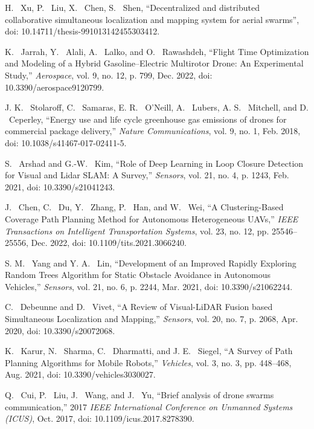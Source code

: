 \documentclass[conference]{IEEEtran}
\begin{document}
\begin{thebibliography}{1}
H. ~Xu, P. ~Liu, X. ~Chen, S. ~Shen, “Decentralized and distributed collaborative simultaneous localization and mapping system for aerial swarms”, doi: 10.14711/thesis-991013142455303412.

K. ~Jarrah, Y. ~Alali, A. ~Lalko, and O. ~Rawashdeh, “Flight Time Optimization and Modeling of a Hybrid Gasoline–Electric Multirotor Drone: An Experimental Study,” \emph{Aerospace}, vol. 9, no. 12, p. 799, Dec. 2022, doi: 10.3390/aerospace9120799.

J. K. ~Stolaroff, C. ~Samaras, E. R. ~O’Neill, A. ~Lubers, A. S. ~Mitchell, and D. ~Ceperley, “Energy use and life cycle greenhouse gas emissions of drones for commercial package delivery,” \emph{Nature Communications}, vol. 9, no. 1, Feb. 2018, doi: 10.1038/s41467-017-02411-5.

S. ~Arshad and G.-W. ~Kim, “Role of Deep Learning in Loop Closure Detection for Visual and Lidar SLAM: A Survey,” \emph{Sensors}, vol. 21, no. 4, p. 1243, Feb. 2021, doi: 10.3390/s21041243.

J. ~Chen, C. ~Du, Y. ~Zhang, P. ~Han, and W. ~Wei, “A Clustering-Based Coverage Path Planning Method for Autonomous Heterogeneous UAVs,” \emph{IEEE Transactions on Intelligent Transportation Systems}, vol. 23, no. 12, pp. 25546–25556, Dec. 2022, doi: 10.1109/tits.2021.3066240.

S. M. ~Yang and Y. A. ~Lin, “Development of an Improved Rapidly Exploring Random Trees Algorithm for Static Obstacle Avoidance in Autonomous Vehicles,” \emph{Sensors}, vol. 21, no. 6, p. 2244, Mar. 2021, doi: 10.3390/s21062244.

C. ~Debeunne and D. ~Vivet, “A Review of Visual-LiDAR Fusion based Simultaneous Localization and Mapping,” \emph{Sensors}, vol. 20, no. 7, p. 2068, Apr. 2020, doi: 10.3390/s20072068.

K. ~Karur, N. ~Sharma, C. ~Dharmatti, and J. E. ~Siegel, “A Survey of Path Planning Algorithms for Mobile Robots,” \emph{Vehicles}, vol. 3, no. 3, pp. 448–468, Aug. 2021, doi: 10.3390/vehicles3030027.

Q. ~Cui, P. ~Liu, J. ~Wang, and J. ~Yu, “Brief analysis of drone swarms communication,” 2017 \emph{IEEE International Conference on Unmanned Systems (ICUS)}, Oct. 2017, doi: 10.1109/icus.2017.8278390.


\end{thebibliography}
\end{document}
